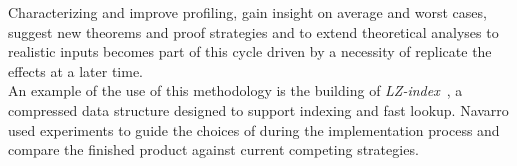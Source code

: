 Characterizing and improve profiling, gain insight on average and worst cases, suggest new theorems and proof strategies and to extend theoretical analyses to realistic inputs becomes part of this cycle driven by a necessity of replicate the effects at a later time.\\

An example of the use of this methodology is the building of \textit{LZ-index}~\cite{Navarro_2009}, a compressed data structure designed to support indexing and fast lookup. Navarro used experiments to guide the choices of during the implementation process and compare the finished product against current competing strategies.\\

